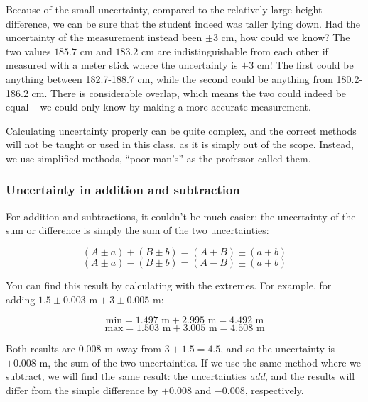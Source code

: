 \documentclass[8.01x]{subfiles}
\begin{document}
Because of the small uncertainty, compared to the relatively large height difference, we can be sure that the student indeed was taller lying down. Had the uncertainty of the measurement instead been $\pm 3$ cm, how could we know? The two values $185.7$ cm and $183.2$ cm are indistinguishable from each other if measured with a meter stick where the uncertainty is $\pm 3$ cm! The first could be anything between 182.7-188.7 cm, while the second could be anything from 180.2-186.2 cm. There is considerable overlap, which means the two could indeed be equal -- we could only know by making a more accurate measurement.

Calculating uncertainty properly can be quite complex, and the correct methods will not be taught or used in this class, as it is simply out of the scope. Instead, we use simplified methods, ``poor man's'' as the professor called them.

\subsubsection{Uncertainty in addition and subtraction}

For addition and subtractions, it couldn't be much easier: the uncertainty of the sum or difference is simply the sum of the two uncertainties:

\begin{equation}
 (A \pm a) + (B \pm b) = (A + B) \pm (a +b)
\end{equation}
\begin{equation}
 (A \pm a) - (B \pm b) = (A - B) \pm (a +b)
\end{equation}

You can find this result by calculating with the extremes. For example, for adding $1.5 \pm 0.003 \text{ m} + 3 \pm 0.005 \text{ m}$:

\begin{equation}
\text{min} = 1.497 \text{ m} + 2.995 \text{ m} = 4.492 \text{ m}
\end{equation}
\begin{equation}
\text{max} = 1.503 \text{ m} + 3.005 \text{ m} = 4.508 \text{ m}
\end{equation}

Both results are $0.008$ m away from $3 + 1.5 = 4.5$, and so the uncertainty is $\pm 0.008$ m, the sum of the two uncertainties.  
If we use the same method where we subtract, we will find the same result: the uncertainties \emph{add}, and the results will differ from the simple difference by $+0.008$ and $-0.008$, respectively.
\end{document}
